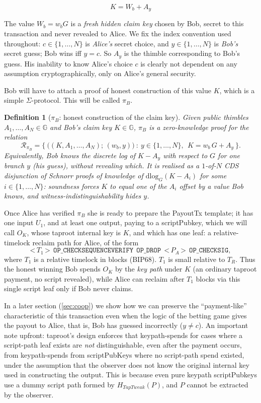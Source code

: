 \documentclass[11pt]{article}
\newtheorem{definition}{Definition}
\begin{document}
\[ K = W_b + A_y \]

The value $W_b = w_b G$ is a \emph{fresh hidden claim key} chosen by Bob, secret to this transaction and never revealed to Alice. We fix the index convention used throughout: $c\in\{1,\dots,N\}$ is \emph{Alice's} secret choice, and $y\in\{1,\dots,N\}$ is \emph{Bob's} secret guess; Bob wins iff $y=c$. So $A_y$ is the thimble corresponding to Bob's guess. His inability to know Alice's choice $c$ is clearly not dependent on any assumption cryptographically, only on Alice's general security.

Bob will have to attach a proof of honest construction of this value $K$, which is a simple $\Sigma$-protocol. This will be called $\pi_B$.

\begin{definition}[$\pi_B$: honest construction of the claim key]
\label{def:piB}
Given public thimbles $A_1,\dots,A_N\in\mathbb{G}$ and Bob's claim key $K\in\mathbb{G}$, $\pi_B$ is a zero-knowledge proof for the relation
\[
\mathcal{R}_{\pi_B}=\Big\{\ \big((K,A_1,\dots,A_N);\,(w_b,y)\big)\ :\ y\in\{1,\dots,N\},\ \ K = w_b\,G + A_y\ \Big\}.
\]
Equivalently, Bob knows the discrete log of $K-A_y$ with respect to $G$ for one branch $y$ (his guess), \emph{without revealing which}. It is realised as a $1$-of-$N$ CDS disjunction \cite{cds} of Schnorr proofs of knowledge of $\mathrm{dlog}_G(K-A_i)$ for some $i\in\{1,\dots,N\}$: soundness forces $K$ to equal one of the $A_i$ offset by a value Bob knows, and witness-indistinguishability hides $y$.
\end{definition}

Once Alice has verified $\pi_B$ she is ready to prepare the PayoutTx template; it has one input $U_1$, and at least one output, paying to a scriptPubkey, which we will call $O_K$, whose taproot internal key is $K$, and which has one leaf: a relative-timelock reclaim path for Alice, of the form
\[
\texttt{<}\,T_1\,\texttt{>}\ \ \texttt{OP\_CHECKSEQUENCEVERIFY}\ \ \texttt{OP\_DROP}\ \ \texttt{<}\,P_A\,\texttt{>}\ \ \texttt{OP\_CHECKSIG},
\]
where $T_1$ is a relative timelock in blocks (BIP68). $T_1$ is small relative to $T_R$. Thus the honest winning Bob spends $O_K$ by the \emph{key path} under $K$ (an ordinary taproot payment, no script revealed), while Alice can reclaim after $T_1$ blocks via this single script leaf only if Bob never claims.

In a later section (\ref{sec:coop}) we show how we can preserve the ``payment-like'' characteristic of this transaction even when the logic of the betting game gives the payout to Alice, that is, Bob has guessed incorrectly ($y\neq c$). An important note upfront: taproot's design \cite{bip341} enforces that keypath-spends for cases where a script-path leaf exists are \emph{not} distinguishable, even after the payment occurs, from keypath-spends from scriptPubKeys where no script-path spend existed, under the assumption that the observer does not know the original internal key used in constructing the output. This is because even pure keypath scriptPubkeys use a dummy script path formed by $H_{TapTweak}(P)$, and $P$ cannot be extracted by the observer.
\end{document}
